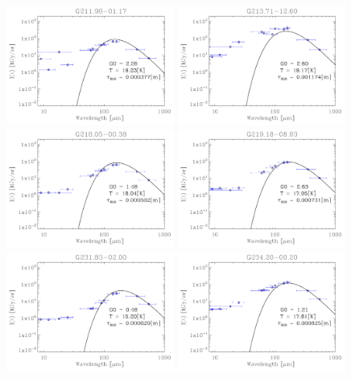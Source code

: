 \begin{figure}
\centering
\includegraphics[trim=-1mm -1mm -1mm -1mm, clip, width=55mm]{appB/appB_54.pdf}
\includegraphics[trim=-1mm -1mm -1mm -1mm, clip, width=55mm]{appB/appB_55.pdf}
\includegraphics[trim=-1mm -1mm -1mm -1mm, clip, width=55mm]{appB/appB_56.pdf}
\includegraphics[trim=-1mm -1mm -1mm -1mm, clip, width=55mm]{appB/appB_57.pdf}
\includegraphics[trim=-1mm -1mm -1mm -1mm, clip, width=55mm]{appB/appB_58.pdf}
\includegraphics[trim=-1mm -1mm -1mm -1mm, clip, width=55mm]{appB/appB_59.pdf}

\end{figure}
